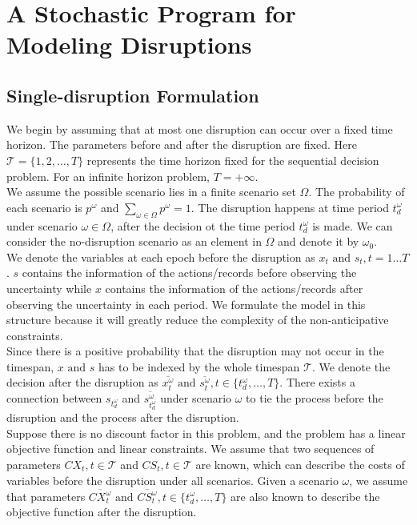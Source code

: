 \documentclass[11pt]{article}
\begin{document}
\section{A Stochastic Program for Modeling Disruptions}
	\subsection{Single-disruption Formulation}\label{1Dformulation}
	We begin by assuming that at most one disruption can occur over a fixed time horizon. The parameters before and after the disruption are fixed. Here \(\mathscr{T}=\{1,2,\dots,T\}\) represents the time horizon fixed for the sequential decision problem. For an infinite horizon problem, \(T=+\infty\).\\ %
	\newline We assume the possible scenario lies in a finite scenario set \(\Omega\). The probability of each scenario is \(p^\omega\) and \(\sum_{\omega \in \Omega} p^\omega = 1\). The disruption happens at time period \(t_d^\omega\) under scenario \(\omega \in \Omega\), after the decision ot the time period \(t_d^\omega\) is made. We can consider the no-disruption scenario as an element in \(\Omega\) and denote it by \(\omega_0\).\\
	\newline We denote the variables at each epoch before the disruption as \(x_t \text{ and } s_t, t = 1 \dots T\). \(s\) contains the information of the actions/records before observing the uncertainty while \(x\) contains the information of the actions/records after observing the uncertainty in each period. We formulate the model in this structure because it will greatly reduce the complexity of the non-anticipative constraints. \\
	\newline Since there is a positive probability that the disruption may not occur in the timespan, \(x \text{ and } s\) has to be indexed by the whole timespan \(\mathscr{T}\). We denote the decision after the disruption as \(\overline{x_t^\omega} \text{ and } \overline{s_t^\omega}, t \in \{t_d^\omega, \dots, T\}\). There exists a connection between \(s_{t_d^\omega}\) and \(\overline{s_{t_d^\omega}^\omega}\) under scenario \(\omega\) to tie the process before the disruption and the process after the disruption.\\
	\newline Suppose there is no discount factor in this problem, and the problem has a linear objective function and linear constraints. We assume that two sequences of parameters \(CX_t, t\in \mathscr{T}\) and \(CS_t, t\in \mathscr{T}\) are known, which can describe the costs of variables before the disruption under all scenarios. Given a scenario \(\omega\), we assume that parameters \(\overline{CX_t^\omega} \text{ and } \overline{CS_t^\omega}, t \in \{t_d^\omega, \dots, T\}\) are also known to describe the objective function after the disruption. \\
\end{document}
